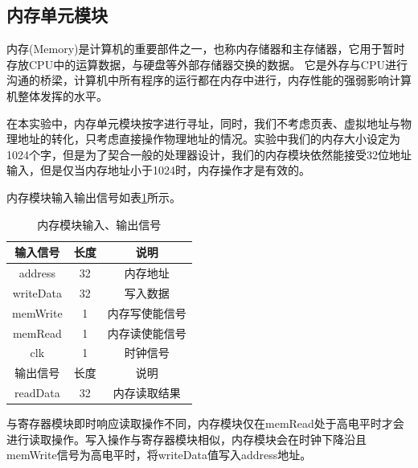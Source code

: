 \documentclass[UTF8]{ctexart}
\begin{document}
    \subsection{内存单元模块}
    内存(Memory)是计算机的重要部件之一，也称内存储器和主存储器，它用于暂时存放CPU中的运算数据，与硬盘等外部存储器交换的数据。 它是外存与CPU进行沟通的桥梁，计算机中所有程序的运行都在内存中进行，内存性能的强弱影响计算机整体发挥的水平。\par
    在本实验中，内存单元模块按字进行寻址，同时，我们不考虑页表、虚拟地址与物理地址的转化，只考虑直接操作物理地址的情况。实验中我们的内存大小设定为1024个字，但是为了契合一般的处理器设计，我们的内存模块依然能接受32位地址输入，但是仅当内存地址小于1024时，内存操作才是有效的。\par
    内存模块输入输出信号如表\ref{tab:mem-input-output-sig}所示。
    \begin{table}[htbp]
        \centering
        \begin{tabular}{|c|c|c|}
        \hline
        输入信号 & 长度 & 说明 \\ \hline
        address & 32 & 内存地址 \\
        writeData & 32 & 写入数据 \\
        memWrite & 1 & 内存写使能信号 \\
        memRead & 1 & 内存读使能信号 \\
        clk & 1 & 时钟信号 \\
        \hline
        \hline
        输出信号 & 长度 & 说明 \\ 
        \hline
        readData & 32 & 内存读取结果\\
        \hline
        \end{tabular}
        \caption{内存模块输入、输出信号}
        \label{tab:mem-input-output-sig}
        \end{table}\par
    与寄存器模块即时响应读取操作不同，内存模块仅在memRead处于高电平时才会进行读取操作。写入操作与寄存器模块相似，内存模块会在时钟下降沿且memWrite信号为高电平时，将writeData值写入address地址。
\end{document}

